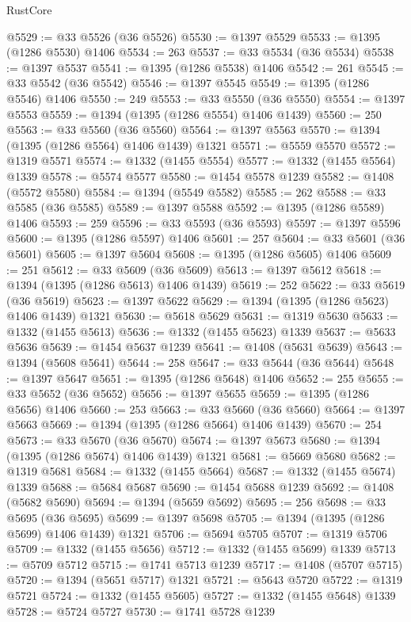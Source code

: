 \begin{lexlean}{RustCore}
\begin{coremodule}
@5529 := @33 @5526 (@36 @5526)
@5530 := @1397 @5529
@5533 := @1395 (@1286 @5530) @1406
@5534 := 263
@5537 := @33 @5534 (@36 @5534)
@5538 := @1397 @5537
@5541 := @1395 (@1286 @5538) @1406
@5542 := 261
@5545 := @33 @5542 (@36 @5542)
@5546 := @1397 @5545
@5549 := @1395 (@1286 @5546) @1406
@5550 := 249
@5553 := @33 @5550 (@36 @5550)
@5554 := @1397 @5553
@5559 := @1394 (@1395 (@1286 @5554) @1406 @1439)
@5560 := 250
@5563 := @33 @5560 (@36 @5560)
@5564 := @1397 @5563
@5570 := @1394 (@1395 (@1286 @5564) @1406 @1439) @1321
@5571 := @5559 @5570
@5572 := @1319 @5571
@5574 := @1332 (@1455 @5554)
@5577 := @1332 (@1455 @5564) @1339
@5578 := @5574 @5577
@5580 := @1454 @5578 @1239
@5582 := @1408 (@5572 @5580)
@5584 := @1394 (@5549 @5582)
@5585 := 262
@5588 := @33 @5585 (@36 @5585)
@5589 := @1397 @5588
@5592 := @1395 (@1286 @5589) @1406
@5593 := 259
@5596 := @33 @5593 (@36 @5593)
@5597 := @1397 @5596
@5600 := @1395 (@1286 @5597) @1406
@5601 := 257
@5604 := @33 @5601 (@36 @5601)
@5605 := @1397 @5604
@5608 := @1395 (@1286 @5605) @1406
@5609 := 251
@5612 := @33 @5609 (@36 @5609)
@5613 := @1397 @5612
@5618 := @1394 (@1395 (@1286 @5613) @1406 @1439)
@5619 := 252
@5622 := @33 @5619 (@36 @5619)
@5623 := @1397 @5622
@5629 := @1394 (@1395 (@1286 @5623) @1406 @1439) @1321
@5630 := @5618 @5629
@5631 := @1319 @5630
@5633 := @1332 (@1455 @5613)
@5636 := @1332 (@1455 @5623) @1339
@5637 := @5633 @5636
@5639 := @1454 @5637 @1239
@5641 := @1408 (@5631 @5639)
@5643 := @1394 (@5608 @5641)
@5644 := 258
@5647 := @33 @5644 (@36 @5644)
@5648 := @1397 @5647
@5651 := @1395 (@1286 @5648) @1406
@5652 := 255
@5655 := @33 @5652 (@36 @5652)
@5656 := @1397 @5655
@5659 := @1395 (@1286 @5656) @1406
@5660 := 253
@5663 := @33 @5660 (@36 @5660)
@5664 := @1397 @5663
@5669 := @1394 (@1395 (@1286 @5664) @1406 @1439)
@5670 := 254
@5673 := @33 @5670 (@36 @5670)
@5674 := @1397 @5673
@5680 := @1394 (@1395 (@1286 @5674) @1406 @1439) @1321
@5681 := @5669 @5680
@5682 := @1319 @5681
@5684 := @1332 (@1455 @5664)
@5687 := @1332 (@1455 @5674) @1339
@5688 := @5684 @5687
@5690 := @1454 @5688 @1239
@5692 := @1408 (@5682 @5690)
@5694 := @1394 (@5659 @5692)
@5695 := 256
@5698 := @33 @5695 (@36 @5695)
@5699 := @1397 @5698
@5705 := @1394 (@1395 (@1286 @5699) @1406 @1439) @1321
@5706 := @5694 @5705
@5707 := @1319 @5706
@5709 := @1332 (@1455 @5656)
@5712 := @1332 (@1455 @5699) @1339
@5713 := @5709 @5712
@5715 := @1741 @5713 @1239
@5717 := @1408 (@5707 @5715)
@5720 := @1394 (@5651 @5717) @1321
@5721 := @5643 @5720
@5722 := @1319 @5721
@5724 := @1332 (@1455 @5605)
@5727 := @1332 (@1455 @5648) @1339
@5728 := @5724 @5727
@5730 := @1741 @5728 @1239

\end{coremodule}
\end{lexlean}
